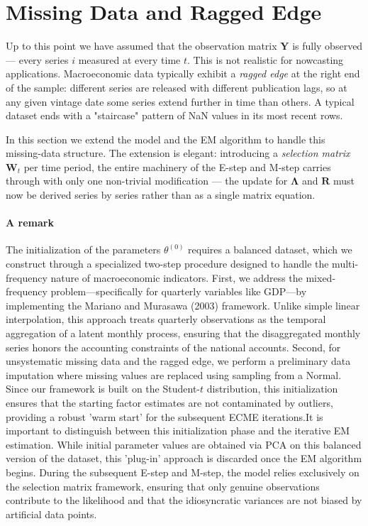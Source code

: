 \documentclass[11pt, a4paper, oneside]{article}
\newcommand{\mL}{\boldsymbol{\Lambda}}
\begin{document}
\newpage

\section{Missing Data and Ragged Edge}
\label{sec:missing-data}

Up to this point we have assumed that the observation matrix $\mathbf{Y}$
is fully observed — every series $i$ measured at every time $t$. This
is not realistic for nowcasting applications. Macroeconomic data
typically exhibit a \emph{ragged edge} at the right end of the sample:
different series are released with different publication lags, so at
any given vintage date some series extend further in time than others.
A typical dataset ends with a "staircase" pattern of NaN values in its
most recent rows.

In this section we extend the model and the EM algorithm to handle
this missing-data structure. The extension is elegant: introducing a
\emph{selection matrix} $\mathbf{W}_t$ per time period, the entire
machinery of the E-step and M-step carries through
with only one non-trivial modification — the update for $\mL$
and $\mathbf{R}$ must now be derived series by series rather than as a
single matrix equation.

\paragraph{A remark}
The initialization of the parameters $\theta^{(0)}$ requires a balanced dataset, which we construct through a specialized two-step procedure designed to handle the multi-frequency nature of macroeconomic indicators. First, we address the mixed-frequency problem—specifically for quarterly variables like GDP—by implementing the Mariano and Murasawa (2003) framework. Unlike simple linear interpolation, this approach treats quarterly observations as the temporal aggregation of a latent monthly process, ensuring that the disaggregated monthly series honors the accounting constraints of the national accounts. Second, for unsystematic missing data and the ragged edge, we perform a preliminary data imputation where missing values are replaced using sampling from a Normal. Since our framework is built on the Student-$t$ distribution, this initialization ensures that the starting factor estimates are not contaminated by outliers, providing a robust 'warm start' for the subsequent ECME iterations.It is important to distinguish between this initialization phase and the iterative EM estimation. While initial parameter values are obtained via PCA on this balanced version of the dataset, this 'plug-in' approach is discarded once the EM algorithm begins. During the subsequent E-step and M-step, the model relies exclusively on the selection matrix framework, ensuring that only genuine observations contribute to the likelihood and that the idiosyncratic variances are not biased by artificial data points.
\end{document}
